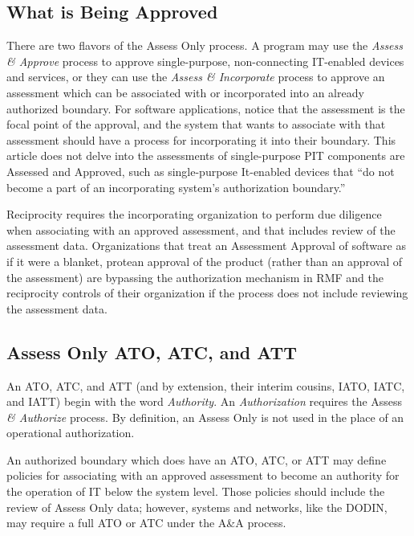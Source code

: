 \subsection{What is Being Approved}
There are two flavors of the Assess Only process. A program may use the \textit{Assess \& Approve} process to approve single-purpose, non-connecting IT-enabled devices and services, or they can use the \textit{Assess \& Incorporate} process to approve an assessment which can be associated with or incorporated into an already authorized boundary.\autocite[\pno~11]{20240212:vaglia2017} For software applications, notice that the assessment is the focal point of the approval, and the system that wants to associate with that assessment should have a process for incorporating it into their boundary. This article does not delve into the assessments of single-purpose PIT components are Assessed and Approved, such as single-purpose It-enabled devices that ``do not become a part of an incorporating system's authorization boundary.''\autocite[DoD CIO Risk Management Framework Assess Only Guidance 2017]{20240212:legislation}

Reciprocity requires the incorporating organization to perform due diligence when associating with an approved assessment, and that includes review of the assessment data. Organizations that treat an Assessment Approval of software as if it were a blanket, protean approval of the product (rather than an approval of the assessment) are bypassing the authorization mechanism in RMF and the reciprocity controls of their organization if the process does not include reviewing the assessment data.

\subsection{Assess Only ATO, ATC, and ATT}
An ATO, ATC, and ATT (and by extension, their interim cousins, IATO, IATC, and IATT) begin with the word \textit{Authority}. An \textit{Authorization} requires the Assess \textit{\& Authorize} process. By definition, an Assess Only is not used in the place of an operational authorization.

An authorized boundary which does have an ATO, ATC, or ATT may define policies for associating with an approved assessment to become an authority for the operation of IT below the system level. Those policies should include the review of Assess Only data; however, systems and networks, like the DODIN, may require a full ATO or ATC under the A\&A process.\autocite{20240212:disncpg}

